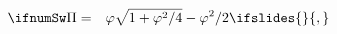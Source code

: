 \begin{eqnarray}
   \ifnumSw   \Pi & = & \varphi \sqrt{1+\varphi^{2}/4} - \varphi^{2}/2 \label{eq:muthOptimal}
\ifslides{}{,}
\end{eqnarray}
